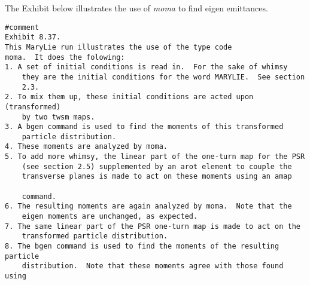 The Exhibit below illustrates the use of {\em moma} to find eigen emittances.

\vspace{5mm}
\begin{footnotesize}
\begin{verbatim}
#comment
Exhibit 8.37.
This MaryLie run illustrates the use of the type code
moma.  It does the folowing:
1. A set of initial conditions is read in.  For the sake of whimsy
    they are the initial conditions for the word MARYLIE.  See section
    2.3.
2. To mix them up, these initial conditions are acted upon (transformed)
    by two twsm maps.
3. A bgen command is used to find the moments of this transformed
    particle distribution.
4. These moments are analyzed by moma.
5. To add more whimsy, the linear part of the one-turn map for the PSR
    (see section 2.5) supplemented by an arot element to couple the
    transverse planes is made to act on these moments using an amap

    command.
6. The resulting moments are again analyzed by moma.  Note that the
    eigen moments are unchanged, as expected.
7. The same linear part of the PSR one-turn map is made to act on the
    transformed particle distribution.
8. The bgen command is used to find the moments of the resulting particle
    distribution.  Note that these moments agree with those found using


\end{verbatim}
\end{footnotesize}
